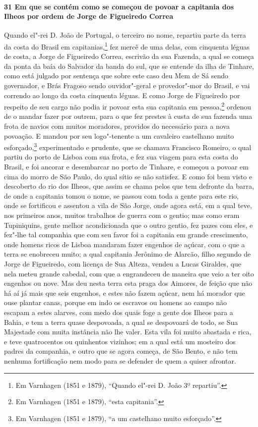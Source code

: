 \begin{linenumbers}
\paragraph{31 Em que se contém como se começou de povoar a capitania dos Ilheos por ordem
de Jorge de Figueiredo Correa} \quad
Quando el"-rei D. João de Portugal, o terceiro no nome, repartiu parte da terra da costa do
Brasil em capitanias,\footnote{ Em Varnhagen (1851 e 1879), ``Quando el"-rei D. João 3º
repartiu''.} fez mercê de uma delas, com cinquenta léguas de costa, a Jorge de Figueiredo
Correa, escrivão da sua Fazenda, a qual se começa da ponta da baía do Salvador da banda do
sul, que se entende da ilha de Tinhare, como está julgado por sentença que sobre este caso
deu Mem de Sá sendo governador, e Brás Fragoso sendo ouvidor"-geral e provedor"-mor do
Brasil, e vai correndo ao longo da costa cinquenta léguas. E como Jorge de Figueiredo por
respeito de seu cargo não podia ir povoar esta sua capitania em pessoa,\footnote{ Em
Varnhagen (1851 e 1879), ``esta capitania''.} ordenou de o mandar fazer por outrem, para o
que fez prestes à custa de sua fazenda uma frota de navios com muitos moradores, providos
do necessário para a nova povoação. E mandou por seu logo"-tenente a um cavaleiro
castelhano muito esforçado,\footnote{ Em Varnhagen (1851 e 1879), ``a um castelhano muito
esforçado''.} experimentado e prudente, que se chamava Francisco Romeiro, o qual partiu do
porto de Lisboa com sua frota, e fez sua viagem para esta costa do Brasil, e foi ancorar e
desembarcar no porto de Tinhare, e começou a povoar em cima do morro de São Paulo, do qual
sítio se não satisfez. E como foi bem visto e descoberto do rio dos Ilheos, que assim se
chama pelos que tem defronte da barra, de onde a capitania tomou o nome, se passou com
toda a gente para este rio, onde se fortificou e assentou a vila de São Jorge, onde agora
está, em a qual teve, nos primeiros anos, muitos trabalhos de guerra com o gentio; mas
como eram Tupiniquins, gente melhor acondicionada que o outro gentio, fez pazes com eles,
e fez"-lhe tal companhia que com seu favor foi a capitania em grande crescimento, onde
homens ricos de Lisboa mandaram fazer engenhos de açúcar, com o que a terra se enobreceu
muito; a qual capitania Jerônimo de Alarcão, filho segundo de Jorge de Figueiredo, com
licença de Sua Alteza, vendeu a Lucas Giraldes, que nela meteu grande cabedal, com que a
engrandeceu de maneira que veio a ter oito engenhos ou nove. Mas deu nesta terra esta
praga dos Aimores, de feição que não há aí já mais que seis engenhos, e estes não fazem
açúcar, nem há morador que ouse plantar canas, porque em indo os escravos ou homens ao
campo não escapam a estes alarves, com medo dos quais foge a gente dos Ilheos para a
Bahia, e tem a terra quase despovoada, a qual se despovoará de todo, se Sua Majestade com
muita instância não lhe valer. Esta vila foi muito abastada e rica, e teve quatrocentos ou
quinhentos vizinhos; em a qual está um mosteiro dos padres da companhia, e outro que se
agora começa, de São Bento, e não tem nenhuma fortificação nem modo para se defender de
quem a quiser afrontar.


\end{linenumbers}
